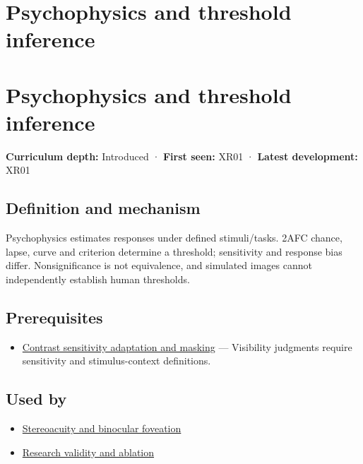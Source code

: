 \hypertarget{appendix-1759f03e8ce7}{}
\section*{Psychophysics and threshold inference}
\section{Psychophysics and threshold inference}\label{appendix-1759f03e8ce7-psychophysics-and-threshold-inference}

\textbf{Curriculum depth:} Introduced · \textbf{First seen:} XR01 · \textbf{Latest development:} XR01

\subsection{Definition and mechanism}\label{appendix-1759f03e8ce7-definition-and-mechanism}

Psychophysics estimates responses under defined stimuli/tasks. 2AFC chance, lapse, curve and criterion determine a threshold; sensitivity and response bias differ. Nonsignificance is not equivalence, and simulated images cannot independently establish human thresholds.

\subsection{Prerequisites}\label{appendix-1759f03e8ce7-prerequisites}

\begin{itemize}
\tightlist
\item
  \hyperref[appendix-b3aa9e8e01ad]{Contrast sensitivity adaptation and masking} --- Visibility judgments require sensitivity and stimulus-context definitions.
\end{itemize}

\subsection{Used by}\label{appendix-1759f03e8ce7-used-by}

\begin{itemize}
\tightlist
\item
  \hyperref[appendix-8dc848f14052]{Stereoacuity and binocular foveation}
\item
  \hyperref[appendix-65788587ef78]{Research validity and ablation}
\end{itemize}


